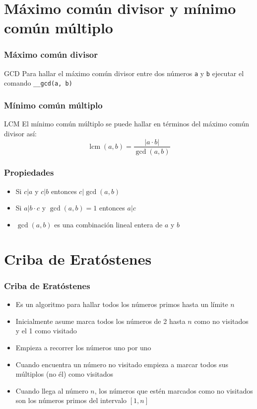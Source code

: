 \documentclass{beamer}
\begin{document}
\section[GCD y LCM]{Máximo común divisor y mínimo común múltiplo}

	\begin{frame}[fragile]
		\frametitle{Máximo común divisor}
		\begin{block}{GCD}
			Para hallar el máximo común divisor entre dos números \verb|a| y \verb|b| ejecutar el comando \verb|__gcd(a, b)|
		\end{block}
	\end{frame}
	
	\begin{frame}
		\frametitle{Mínimo común múltiplo}
		\begin{block}{LCM}
			El mínimo común múltiplo se puede hallar en términos del máximo común divisor así:
			$$ \operatorname{lcm}(a, b) = \frac{|a \cdot b|}{\operatorname{gcd}(a,b)}$$
		\end{block}
	\end{frame}
	
	\begin{frame}
		\frametitle{Propiedades}
		\begin{itemize}
			\item Si $c|a$ y $c|b$ entonces $c|\operatorname{gcd}(a, b)$
			\item Si $a|b\cdot c$ y $\operatorname{gcd}(a,b) = 1$ entonces $a|c$
			\item $\operatorname{gcd}(a,b)$ es una combinación lineal entera de $a$ y $b$
		\end{itemize}
	\end{frame}

\section[Criba]{Criba de Eratóstenes}

	\begin{frame}
		\frametitle{Criba de Eratóstenes}
		\begin{itemize}
			\item Es un algoritmo para hallar todos los números primos hasta un límite $n$
			\item Inicialmente asume marca todos los números de 2 hasta $n$ como no visitados y el 1 como visitado
			\item Empieza a recorrer los números uno por uno
			\item Cuando encuentra un número no visitado empieza a marcar todos sus múltiplos (no él) como visitados
			\item Cuando llega al número $n$, los números que estén marcados como no visitados son los números primos del intervalo $[1, n]$
		\end{itemize}
	\end{frame}
	
\end{document}
